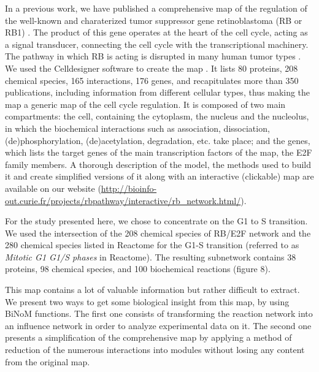\documentclass[10pt]{bmc_article}
\newenvironment{bmcformat}{\baselineskip20pt\sloppy\setboolean{publ}{false}}{\baselineskip20pt\sloppy}
\begin{document}
\begin{bmcformat}
In a previous work, we have published a comprehensive map of the regulation of the well-known and charaterized tumor
suppressor gene retinoblastoma (RB or RB1) \cite{calzone2008comprehensive}. The product of this gene operates at
the heart of the cell cycle, acting as a signal transducer, connecting the
cell cycle with the transcriptional machinery. The pathway in which RB is
acting is disrupted in many human tumor types \cite{weinberg1995retinoblastoma}.
We used the Celldesigner software to create the map \cite{funahashi2003celldesigner}. It lists 80 proteins, 208 chemical species, 165
interactions, 176 genes, and recapitulates more than 350 publications, including
information from different cellular types, thus making the map a generic map of
the cell cycle regulation. It is composed of two main compartments: the cell,
containing the cytoplasm, the nucleus and the nucleolus, in which the
biochemical interactions such as association, dissociation, (de)phosphorylation,
(de)acetylation, degradation, etc. take place; and the genes, which lists the
target genes of the main transcription factors of the map, the E2F family
members.
A thorough description of the model, the methods used to build it and create
simplified versions of it along with an interactive (clickable) map are
available on our website
(\url{http://bioinfo-out.curie.fr/projects/rbpathway/interactive/rb_network.html/}).

For the study presented here, we chose to concentrate on the G1 to S transition. We
used the intersection of the 208 chemical species
of RB/E2F network and the 280 chemical species listed in Reactome \cite{joshi2005reactome} for the G1-S transition
(referred to as \emph{Mitotic G1 G1/S phases} in Reactome). The resulting
subnetwork contains 38 proteins, 98 chemical species, and 100 biochemical
reactions (figure 8).


This map contains a lot of valuable information but rather difficult to extract. We present two
ways to get some biological insight from this map, by using BiNoM functions. The first one consists of
transforming the reaction network into an influence network in order to analyze
experimental data on it. The second one presents a simplification of the comprehensive map by
applying a method of reduction of the numerous interactions into modules without
losing any content from the original map.


\end{bmcformat}
\end{document}
